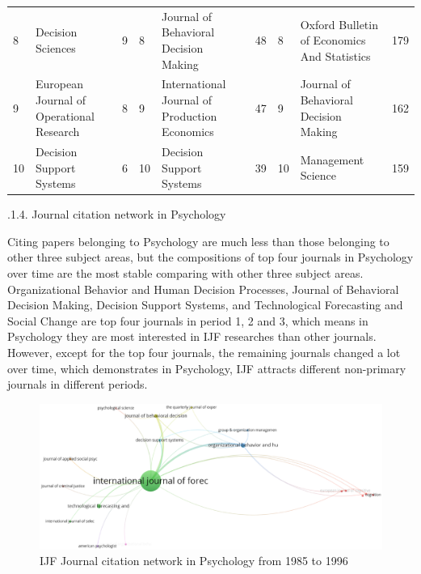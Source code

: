 \documentclass[11pt,a4paper]{elsarticle} %
\begin{document}
\begin{landscape}
\begin{table}[!htbp]
{\begin{tabular}{p{1.5cm}<{\centering} p{6cm}<{\centering} p{1.5cm}<{\centering}|p{1.5cm}<{\centering} p{6cm}<{\centering} p{1.5cm}<{\centering}|p{1.5cm}<{\centering} p{6cm}<{\centering} p{1.5cm}<{\centering}}
8 & Decision Sciences & 9 & 8 & Journal of Behavioral Decision Making & 48 & 8 & Oxford Bulletin of Economics And Statistics & 179\\
9 & European Journal of Operational Research & 8 & 9 & International Journal of Production Economics & 47 & 9 & Journal of Behavioral Decision Making & 162\\
10 & Decision Support Systems & 6 & 10 & Decision Support Systems & 39 & 10 & Management Science & 159\\
  \hline
  \hline
    \end{tabular}}
\end{table}
\end{landscape}

.1.4. Journal citation network in Psychology

Citing papers belonging to Psychology are much less than those belonging
to other three subject areas, but the compositions of top four journals
in Psychology over time are the most stable comparing with other three
subject areas. Organizational Behavior and Human Decision Processes,
Journal of Behavioral Decision Making, Decision Support Systems, and
Technological Forecasting and Social Change are top four journals in
period 1, 2 and 3, which means in Psychology they are most interested in
IJF researches than other journals. However, except for the top four
journals, the remaining journals changed a lot over time, which
demonstrates in Psychology, IJF attracts different non-primary journals
in different periods.

\begin{figure}[htbp]
\centering
\includegraphics[scale=0.3]{fig.17.eps}
\caption{ IJF Journal citation network in Psychology from 1985 to 1996}
\end{figure}
\end{document}
